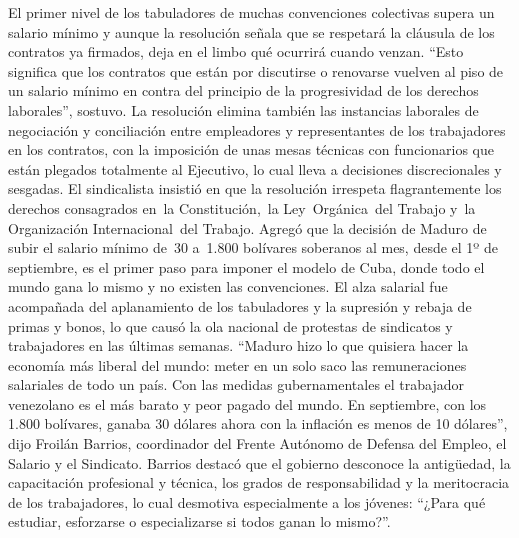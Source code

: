 \documentclass{article}%
\begin{document}
\newline%
%
El primer nivel de los tabuladores de muchas convenciones colectivas supera un salario mínimo y aunque la resolución señala que se respetará la cláusula de los contratos ya firmados, deja en el limbo qué ocurrirá cuando venzan.%
\newline%
%
“Esto significa que los contratos que están por discutirse o renovarse vuelven al piso de un salario mínimo en contra del principio de la progresividad de los derechos laborales”, sostuvo.%
\newline%
%
La resolución elimina también las instancias laborales de negociación y conciliación entre empleadores y representantes de los trabajadores en los contratos, con la imposición de unas mesas técnicas con funcionarios que están plegados totalmente al Ejecutivo, lo cual lleva a decisiones discrecionales y sesgadas.%
\newline%
%
El sindicalista insistió en que la resolución irrespeta flagrantemente los derechos consagrados en~la Constitución,~la Ley~Orgánica~del Trabajo y~la Organización Internacional~del Trabajo.%
\newline%
%
Agregó que la decisión de Maduro de subir el salario mínimo de~30 a~1.800 bolívares soberanos al mes, desde el 1º de septiembre, es el primer paso para imponer el modelo de Cuba, donde todo el mundo gana lo mismo y no existen las convenciones.%
\newline%
%
El alza salarial fue acompañada del aplanamiento de los tabuladores y la supresión y rebaja de primas y bonos, lo que causó la ola nacional de protestas de sindicatos y trabajadores en las últimas semanas.%
\newline%
%
“Maduro hizo lo que quisiera hacer la economía más liberal del mundo: meter en un solo saco las remuneraciones salariales de todo un país. Con las medidas gubernamentales el trabajador venezolano es el más barato y peor pagado del mundo. En septiembre, con los 1.800 bolívares, ganaba 30 dólares ahora con la inflación es menos de 10 dólares”, dijo Froilán Barrios, coordinador del Frente Autónomo de Defensa del Empleo, el Salario y el Sindicato.%
\newline%
%
Barrios destacó que el gobierno desconoce la antigüedad, la capacitación profesional y técnica, los grados de responsabilidad y la meritocracia de los trabajadores, lo cual desmotiva especialmente a los jóvenes: “¿Para qué estudiar, esforzarse o especializarse si todos ganan lo mismo?”.%
\newline%
%
\end{document}

